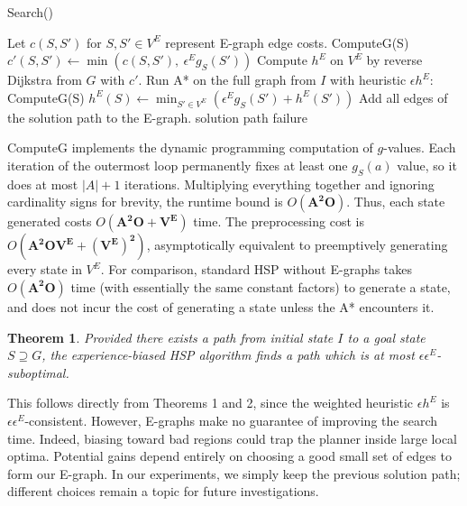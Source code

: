\documentclass[letterpaper]{article}
\newtheorem{thm}{Theorem}
\begin{document}
\begin{algorithm}
\caption{Search()}
\label{alg:Search}
\begin{algorithmic}
\STATE Let $c(S,S')$ for $S,S'\in V^E$ represent E-graph edge costs.
\STATE ComputeG(S)
\STATE $c'(S,S') \leftarrow \min\left(c(S,S'),~\epsilon^E g_S(S')\right)$
\ENDFOR
\ENDFOR
\STATE Compute $h^E$ on $V^E$ by reverse Dijkstra from $G$ with $c'$.
\STATE Run A* on the full graph from $I$ with heuristic $\epsilon h^E$:
\STATE ComputeG(S)
\STATE $h^E(S) \leftarrow \min_{S'\in V^E} \left( \epsilon^E g_S(S') + h^E(S') \right)$
\ENDFOR
{}
\STATE Add all edges of the solution path to the E-graph.
\RETURN solution path
\ELSE
\RETURN failure
\ENDIF
\end{algorithmic}
\end{algorithm}

ComputeG implements the dynamic programming computation of $g$-values.
Each iteration of the outermost loop permanently fixes at least one $g_S(a)$ value, so it does at most $|A|+1$ iterations.
Multiplying everything together and ignoring cardinality signs for brevity, the runtime bound is $O(\mathbf{A^2O})$.
Thus, each state generated costs $O(\mathbf{A^2O + V^E})$ time.
The preprocessing cost is $O(\mathbf{A^2OV^E + (V^E)^2})$, asymptotically equivalent to preemptively generating every state in $V^E$.
For comparison, standard HSP without E-graphs takes $O(\mathbf{A^2O})$ time (with essentially the same constant factors) to generate a state, and does not incur the cost of generating a state unless the A* encounters it.

\begin{thm}
Provided there exists a path from initial state $I$ to a goal state $S\supseteq G$, the experience-biased HSP algorithm finds a path which is at most $\epsilon\epsilon^E$-suboptimal.
\end{thm}

This follows directly from Theorems 1 and 2, since the weighted heuristic $\epsilon h^E$ is $\epsilon \epsilon^E$-consistent.
However, E-graphs make no guarantee of improving the search time. Indeed, biasing toward bad regions could trap the planner inside large local optima.
Potential gains depend entirely on choosing a good small set of edges to form our E-graph.
In our experiments, we simply keep the previous solution path; different choices remain a topic for future investigations.
\end{document}
